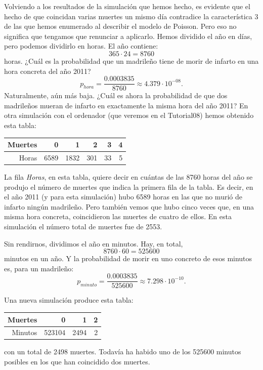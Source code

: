 \begin{ejemplo}
Volviendo a los resultados de la simulación que hemos hecho, es evidente que el hecho de que
coincidan varias muertes un mismo día contradice la característica 3 de las que hemos enumerado al
describir el modelo de Poisson. Pero eso no significa que tengamos que renunciar a aplicarlo. Hemos
dividido el año en días, pero podemos dividirlo en horas. El año contiene:
\[365\cdot 24= 8760\]
horas. ¿Cuál es la probabilidad que un madrileño tiene de morir de infarto en una hora concreta del
año 2011?
\[p_{hora}=\dfrac{0.0003835}{8760}\approx 4.379\cdot 10^{-08}.\]
Naturalmente, aún más baja. ¿Cuál es ahora la probabilidad de que dos madrileños mueran de infarto
en exactamente la misma hora del año 2011? En otra simulación con el ordenador (que veremos en el Tutorial08) hemos obtenido esta tabla:

\begin{table}[h!]
\centering
\begin{tabular}{rrrrrr}
  \hline
Muertes & 0 & 1 & 2 & 3 & 4 \\
  \hline
Horas & 6589 & 1832 & 301 &  33 &   5 \\
   \hline
\end{tabular}
\end{table}

La fila {\em Horas}, en esta tabla, quiere decir en cuántas de las 8760 horas del año se produjo el
número de muertes que indica la primera fila de la tabla. Es decir, en el año 2011 (y para esta
simulación) hubo 6589 horas en las que no murió de infarto ningún madrileño. Pero también vemos que
hubo cinco veces que, en una misma hora concreta, coincidieron las muertes de cuatro de ellos. En
esta simulación el número total de muertes fue de 2553.

Sin rendirnos, dividimos el año en minutos. Hay, en total,
\[8760\cdot 60= 525600\]
minutos en un año. Y la probabilidad de morir en uno concreto de esos minutos es, para un
madrileño:
\[p_{minuto}=\dfrac{0.0003835}{525600}\approx 7.298\cdot 10^{-10}.\]

Una nueva simulación produce esta tabla:
\begin{table}[h!]
\centering
\begin{tabular}{rrrr}
  \hline
Muertes  & 0 & 1 & 2 \\
  \hline
Minutos  & 523104 & 2494 &   2 \\
   \hline
\end{tabular}
\end{table}
con un total de 2498 muertes. Todavía ha habido uno de los 525600 minutos posibles en los que han
coincidido dos muertes.


\end{ejemplo}
